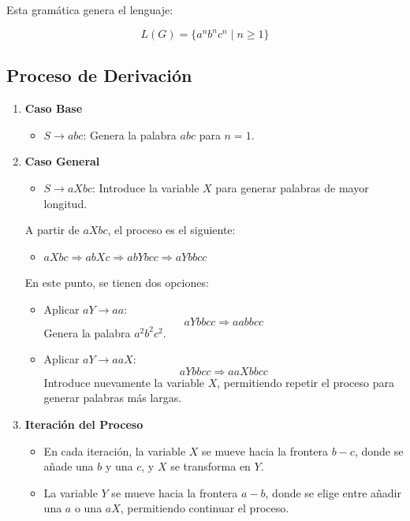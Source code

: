 \documentclass[12pt]{report} %
\providecommand{\tightlist}{%
  \setlength{\itemsep}{0pt}\setlength{\parskip}{0pt}}
\begin{document}
Esta gramática genera el lenguaje:

\[
L(G) = \{a^n b^n c^n \mid n \geq 1\}
\]

\hypertarget{proceso-de-derivaciuxf3n}{%
\subsection{Proceso de Derivación}\label{proceso-de-derivaciuxf3n}}

\begin{enumerate}
\def\labelenumi{\arabic{enumi}.}
\tightlist
\item
  \textbf{Caso Base}

  \begin{itemize}
  \tightlist
  \item
    \(S \to abc\): Genera la palabra \(abc\) para \(n = 1\).
  \end{itemize}
\item
  \textbf{Caso General}

  \begin{itemize}
  \tightlist
  \item
    \(S \to aXbc\): Introduce la variable \(X\) para generar palabras de
    mayor longitud.
  \end{itemize}

  A partir de \(aXbc\), el proceso es el siguiente:

  \begin{itemize}
  \tightlist
  \item
    \(aXbc \Rightarrow abXc \Rightarrow abYbcc \Rightarrow aYbbcc\)
  \end{itemize}

  En este punto, se tienen dos opciones:

  \begin{itemize}
  \item
    Aplicar \(aY \to aa\):\\
    \[
    aYbbcc \Rightarrow aabbcc
    \] Genera la palabra \(a^2b^2c^2\).
  \item
    Aplicar \(aY \to aaX\):\\
    \[
    aYbbcc \Rightarrow aaXbbcc
    \] Introduce nuevamente la variable \(X\), permitiendo repetir el
    proceso para generar palabras más largas.
  \end{itemize}
\item
  \textbf{Iteración del Proceso}

  \begin{itemize}
  \tightlist
  \item
    En cada iteración, la variable \(X\) se mueve hacia la frontera
    \(b-c\), donde se añade una \(b\) y una \(c\), y \(X\) se transforma
    en \(Y\).\\
  \item
    La variable \(Y\) se mueve hacia la frontera \(a-b\), donde se elige
    entre añadir una \(a\) o una \(aX\), permitiendo continuar el
    proceso.
  \end{itemize}
\end{enumerate}
\end{document}
